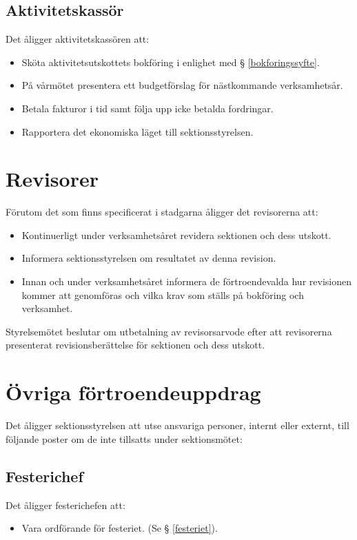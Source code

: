 \documentclass{datateknologsektionen-document}
\begin{document}
\subsection{Aktivitetskassör}
\label{aktukassor}
Det åligger aktivitetskassören att:
\begin{itemize}
  \item Sköta aktivitetsutskottets bokföring i enlighet med § \ref{bokforingssyfte}.
  \item På vårmötet presentera ett budgetförslag för nästkommande verksamhetsår.
  \item Betala fakturor i tid samt följa upp icke betalda fordringar.
  \item Rapportera det ekonomiska läget till sektionsstyrelsen.
\end{itemize}
\section{Revisorer}
Förutom det som finns specificerat i stadgarna åligger det revisorerna att:
\begin{itemize}
  \item Kontinuerligt under verksamhetsåret revidera sektionen och dess utskott.
  \item Informera sektionsstyrelsen om resultatet av denna revision.
  \item Innan och under verksamhetsåret informera de förtroendevalda hur revisionen kommer att genomföras och vilka krav som ställs på bokföring och verksamhet.
\end{itemize}
Styrelsemötet beslutar om utbetalning av revisorsarvode efter att revisorerna presenterat
revisionsberättelse för sektionen och dess utskott.

\section{Övriga förtroendeuppdrag}

Det åligger sektionsstyrelsen att utse ansvariga personer, internt eller externt, till följande poster
om de inte tillsatts under sektionsmötet:
\subsection{Festerichef}
Det åligger festerichefen att:
\begin{itemize}
  \item Vara ordförande för festeriet. (Se § \ref{festeriet}).
\end{itemize}
\end{document}
